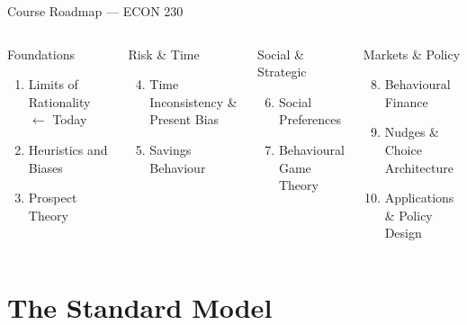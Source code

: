 \documentclass[aspectratio=169]{beamer}
\begin{document}
\begin{frame}{Course Roadmap --- ECON 230}
\begin{columns}
\begin{block}{Foundations}
\begin{enumerate}
  \item Limits of Rationality \textcolor{berust}{$\leftarrow$ Today}
  \item Heuristics and Biases
  \item Prospect Theory
\end{enumerate}
\end{block}
\begin{block}{Risk \& Time}
\begin{enumerate}\setcounter{enumi}{3}
  \item Time Inconsistency \& Present Bias
  \item Savings Behaviour
\end{enumerate}
\end{block}
\begin{block}{Social \& Strategic}
\begin{enumerate}\setcounter{enumi}{5}
  \item Social Preferences
  \item Behavioural Game Theory
\end{enumerate}
\end{block}
\begin{block}{Markets \& Policy}
\begin{enumerate}\setcounter{enumi}{7}
  \item Behavioural Finance
  \item Nudges \& Choice Architecture
  \item Applications \& Policy Design
\end{enumerate}
\end{block}
\end{columns}
\end{frame}

\section{The Standard Model}
\end{document}
